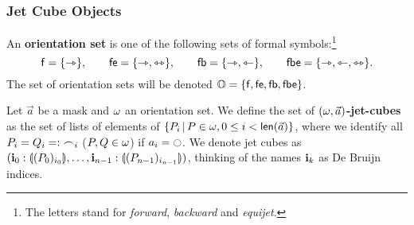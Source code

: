 \documentclass[a4paper]{memoir}
\begin{document}
\subsubsection{Jet Cube Objects}
\begin{definition}
	An \textbf{orientation set} is one of the following sets of formal symbols:\footnote{The letters stand for \emph{forward}, \emph{backward} and \emph{equijet}.}
	\[
		{\mathsf{f}} = \mathopen{}\left\{ {\rightarrowtriangle} \right\}\mathclose{}, \qquad
		{\mathsf{fe}} = \mathopen{}\left\{ {\rightarrowtriangle}, {\leftrightarrowtriangle} \right\}\mathclose{}, \qquad
		{\mathsf{fb}} = \mathopen{}\left\{ {\rightarrowtriangle}, {\leftarrowtriangle} \right\}\mathclose{}, \qquad
		{\mathsf{fbe}} = \mathopen{}\left\{ {\rightarrowtriangle}, {\leftarrowtriangle}, {\leftrightarrowtriangle} \right\}\mathclose{}.
	\]
	The set of orientation sets will be denoted ${\mathbb{O}} = \mathopen{}\left\{ {\mathsf{f}}, {\mathsf{fe}}, {\mathsf{fb}}, {\mathsf{fbe}} \right\}\mathclose{}$.
\end{definition}
\begin{definition} \label{def:jet-cube}
	Let $\vec a$ be a mask and $\omega$ an orientation set.
	We define the set of \textbf{$(\omega, \vec{a})$-jet-cubes} as the set of lists of elements of $\mathopen{}\left\{ P_i \,\middle|\, P \in \omega, 0 \leq i < \mathsf{len}(\vec a) \right\}\mathclose{}$,
	where we identify all $P_i = Q_i =: {\frown}_i$ ($P, Q \in \omega$) if $a_i = \npolar$.
	We denote jet cubes as
	$(\mathbf{i}_0 : {\llparenthesis (P_0)_{i_0} \rrparenthesis}, \ldots, \mathbf{i}_{n-1} : {\llparenthesis (P_{n-1})_{i_{n-1}} \rrparenthesis})$,
	thinking of the names $\mathbf{i}_k$ as De Bruijn indices.
	
%	
%	
\end{definition}
\end{document}
